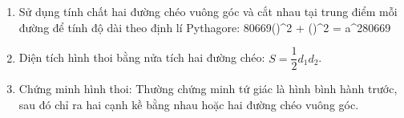 \begin{enumerate}
\item Sử dụng tính chất hai đường chéo vuông góc và cắt nhau tại trung điểm mỗi đường để tính độ dài theo định lí Pythagore:
80669\left(\right)^2 + \left(\right)^2 = a^280669
\item Diện tích hình thoi bằng nửa tích hai đường chéo: $\boxed{S = \dfrac{1}{2}d_1 d_2}$.
\item Chứng minh hình thoi: Thường chứng minh tứ giác là hình bình hành trước, sau đó chỉ ra hai cạnh kề bằng nhau hoặc hai đường chéo vuông góc.
\end{enumerate}
